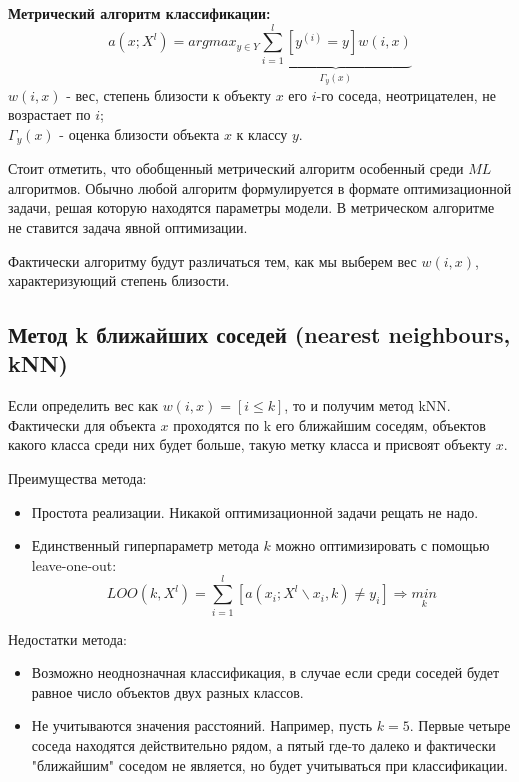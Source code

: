 \textbf{Метрический алгоритм классификации:}
\begin{equation}
    a(x; X^l) = arg max_{y \in Y} \underbrace{\sum_{i = 1}^l [y^{(i)} = y]w(i ,x)}_{\Gamma_y(x)}
\end{equation}
$w(i, x)$ - вес, степень близости к объекту $x$ его $i$-го соседа, неотрицателен, не возрастает по $i$; \\
$\Gamma_y(x)$ - оценка близости объекта $x$ к классу $y$.

Стоит отметить, что обобщенный метрический алгоритм особенный среди $ML$ алгоритмов. Обычно любой алгоритм формулируется в формате оптимизационной задачи, решая которую находятся параметры модели. В метрическом алгоритме не ставится задача явной оптимизации.

Фактически алгоритму будут различаться тем, как мы выберем вес $w(i, x)$, характеризующий степень близости.

\subsection{Метод k ближайших соседей (nearest neighbours, kNN)}
Если определить вес как $w(i, x) = [i \le k]$, то и получим метод kNN. Фактически для объекта $x$ проходятся по k его ближайшим соседям, объектов какого класса среди них будет больше, такую метку класса и присвоят объекту $x$.

Преимущества метода:
\begin{itemize}
    \item Простота реализации. Никакой оптимизационной задачи рещать не надо.
    \item Единственный гиперпараметр метода $k$ можно оптимизировать с помощью leave-one-out:
    \begin{equation}
        LOO(k, X^l) = \sum_{i = 1}^l \left[ a(x_i; X^l \backslash x_i, k) \neq y_i \right] \Rightarrow \underset{k}{min}
    \end{equation}
\end{itemize}
Недостатки метода:
\begin{itemize}
    \item Возможно неоднозначная классификация, в случае если среди соседей будет равное число объектов двух разных классов.
    \item Не учитываются значения расстояний. Например, пусть $k = 5$. Первые четыре соседа находятся действительно рядом, а пятый где-то далеко и фактически "ближайшим" соседом не является, но будет учитываться при классификации.
\end{itemize}

